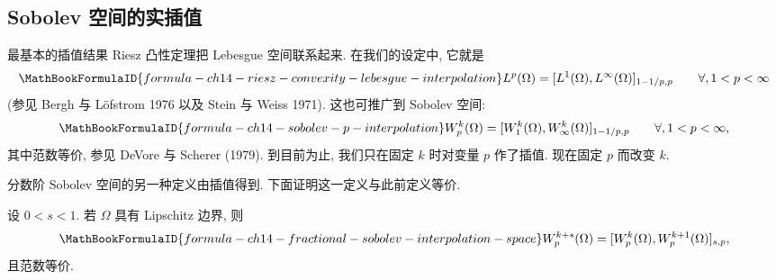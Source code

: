 \subsection{Sobolev 空间的实插值}
\label{sec:ch14-real-interpolation-sobolev-spaces}
\setcounter{thmcount}{0}
\setcounter{equation}{0}

最基本的插值结果 Riesz 凸性定理把 Lebesgue 空间联系起来. 在我们的设定中, 它就是
\begin{equation}
\MathBookFormulaID{formula-ch14-riesz-convexity-lebesgue-interpolation}
\label{eq:ch14-riesz-convexity-lebesgue-interpolation}
L^p(\Omega)=[L^1(\Omega),L^\infty(\Omega)]_{1-1/p,p}
\qquad\forall,1<p<\infty
\end{equation}
(参见 Bergh 与 Löfstrom 1976 以及 Stein 与 Weiss 1971). 这也可推广到 Sobolev 空间:
\begin{equation}
\MathBookFormulaID{formula-ch14-sobolev-p-interpolation}
\label{eq:ch14-sobolev-p-interpolation}
W_p^k(\Omega)=[W_1^k(\Omega),W_\infty^k(\Omega)]_{1-1/p,p}
\qquad\forall,1<p<\infty,
\end{equation}
其中范数等价, 参见 DeVore 与 Scherer (1979). 到目前为止, 我们只在固定 $k$ 时对变量 $p$ 作了插值. 现在固定 $p$ 而改变 $k$.

分数阶 Sobolev 空间的另一种定义由插值得到. 下面证明这一定义与此前定义等价.
\begin{Theorem}
\label{thm:ch14-fractional-sobolev-real-interpolation}
设 $0<s<1$. 若 $\Omega$ 具有 Lipschitz 边界, 则
\[
\MathBookFormulaID{formula-ch14-fractional-sobolev-interpolation-space}
W_p^{k+s}(\Omega)=[W_p^k(\Omega),W_p^{k+1}(\Omega)]_{s,p},
\]
且范数等价.
\end{Theorem}

